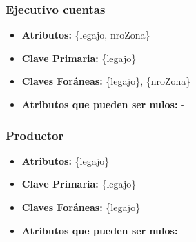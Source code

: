 \documentclass[a4paper,11pt]{article}
\begin{document}


	
	
	
	

\subsubsection{Ejecutivo cuentas}

\begin{itemize}

	\item \textbf{Atributos:} \{legajo, nroZona\}
	
	\item \textbf{Clave Primaria:} \{legajo\}
	
	\item \textbf{Claves Foráneas:} \{legajo\}, \{nroZona\}
	
	\item \textbf{Atributos que pueden ser nulos:} -
	
\end{itemize}

\subsubsection{Productor}

\begin{itemize}

	\item \textbf{Atributos:} \{legajo\}
	
	\item \textbf{Clave Primaria:} \{legajo\}
	
	\item \textbf{Claves Foráneas:} \{legajo\}
	
	\item \textbf{Atributos que pueden ser nulos:} -
	
\end{itemize}
\end{document}

